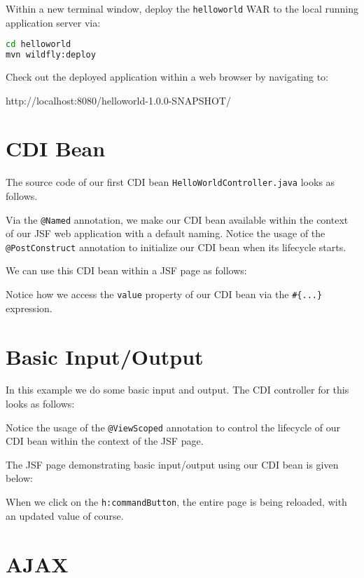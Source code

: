 Within a new terminal window, deploy the \texttt{helloworld} WAR to the local running application server via:
\begin{lstlisting}[language=bash]
cd helloworld
mvn wildfly:deploy
\end{lstlisting}

Check out the deployed application within a web browser by navigating to:

http://localhost:8080/helloworld-1.0.0-SNAPSHOT/

\section{CDI Bean}

The source code of our first CDI \cite{CDI2} bean \texttt{HelloWorldController.java} looks as follows.

Via the \texttt{@Named} annotation, we make our CDI bean available within the context of our JSF web application with a default naming.
Notice the usage of the \texttt{@PostConstruct} annotation to initialize our CDI bean when its lifecycle starts.

We can use this CDI bean within a JSF page as follows:

Notice how we access the \texttt{value} property of our CDI bean via the \texttt{\#\{...\}} expression.

\section{Basic Input/Output}
\label{sec:basic-input-output}

In this example we do some basic input and output.
The CDI controller for this looks as follows:

Notice the usage of the \texttt{@ViewScoped} annotation to control the lifecycle of our CDI bean within the context of the JSF page.

The JSF page demonstrating basic input/output using our CDI bean is given below:

When we click on the \texttt{h:commandButton}, the entire page is being reloaded, with an updated value of course.


\section{AJAX}

